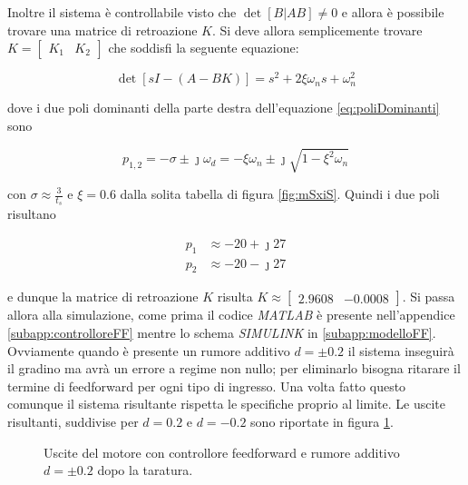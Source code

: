 		\noindent Inoltre il sistema è controllabile visto che $\det[B|AB]\ne 0$ e allora è possibile trovare una matrice di retroazione $K$. Si deve allora semplicemente trovare $K=\begin{bmatrix}K_1 & K_2 \end{bmatrix}$ che soddisfi la seguente equazione:
		
		\begin{equation}
			\det[sI-(A-BK)] = s^2 + 2\xi\omega_ns+\omega_n^2
			\label{eq:poliDominanti}
		\end{equation} 
		
		\noindent dove i due poli dominanti della parte destra dell'equazione \ref{eq:poliDominanti} sono
		
		\begin{equation*}
			p_{1,2}=-\sigma \pm \jmath\omega_d=-\xi\omega_n\pm\jmath\sqrt{1-\xi^2\omega_n}
		\end{equation*}
		
		\noindent con $\sigma\approx\frac{3}{t_s}$ e $\xi=0.6$ dalla solita tabella di figura \ref{fig:mSxiS}. Quindi i due poli risultano
		
		\begin{align*}
			p_1 &\approx -20 + \jmath 27 \\
			p_2 &\approx -20 - \jmath 27 
		\end{align*}
		
		\noindent e dunque la matrice di retroazione $K$ risulta $K\approx\begin{bmatrix}2.9608 & -0.0008\end{bmatrix}$. Si passa allora alla simulazione, come prima il codice \textit{MATLAB} è presente nell'appendice \ref{subapp:controlloreFF} mentre lo schema \textit{SIMULINK} in \ref{subapp:modelloFF}. Ovviamente quando è presente un rumore additivo $d=\pm 0.2$ il sistema inseguirà il gradino ma avrà un errore a regime non nullo; per eliminarlo bisogna ritarare il termine di feedforward per ogni tipo di ingresso. Una volta fatto questo comunque il sistema risultante rispetta le specifiche proprio al limite. Le uscite risultanti, suddivise per $d=0.2$ e $d=-0.2$ sono riportate in figura \ref{fig:FFd}.
		
		\begin{figure}[H]
			\centering
			 
			\caption{Uscite del motore con controllore feedforward e rumore additivo $d=\pm 0.2$ dopo la taratura.}
			\label{fig:FFd}		
		\end{figure}	
		
